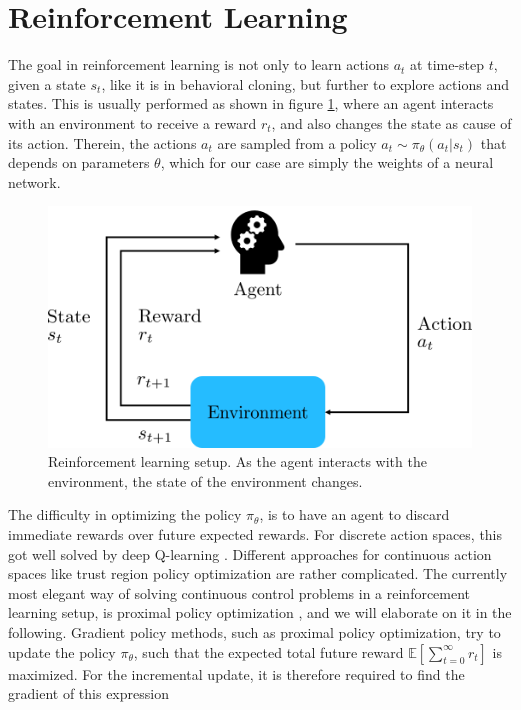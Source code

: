 \FloatBarrier
\section{Reinforcement Learning}
\label{sec::32_rl}
The goal in reinforcement learning is not only to learn actions $a_t$ at time-step $t$, given a state $s_t$, like it is in behavioral cloning, but further to explore actions and states. This is usually performed as shown in figure \ref{fig::32_rl}, where an agent interacts with an environment to receive a reward $r_t$, and also changes the state as cause of its action. Therein, the actions $a_t$ are sampled from a policy $a_t\sim\pi_\theta(a_t|s_t)$ that depends on parameters $\theta$, which for our case are simply the weights of a neural network. 
\begin{figure}[h!]
	\centering
	\includegraphics[scale=.5]{chapters/03_principles_of_machine_learning/img/reinforcement_learning.png}
	\caption{Reinforcement learning setup. As the agent interacts with the environment, the state of the environment changes.}
	\label{fig::32_rl}
\end{figure}
The difficulty in optimizing the policy $\pi_\theta$, is to have an agent to discard immediate rewards over future expected rewards. For discrete action spaces, this got well solved by deep Q-learning \cite{mnih2015human}. Different approaches for continuous action spaces like trust region policy optimization \cite{schulman2015trust} are rather complicated. The currently most elegant way of solving continuous control problems in a reinforcement learning setup, is proximal policy optimization \cite{schulman2017proximal}, and we will elaborate on it in the following. Gradient policy methods, such as proximal policy optimization, try to update the policy $\pi_\theta$, such that the expected total future reward $\mathbb{E}\left[\sum_{t=0}^\infty r_t\right]$ is maximized. For the incremental update, it is therefore required to find the gradient of this expression
